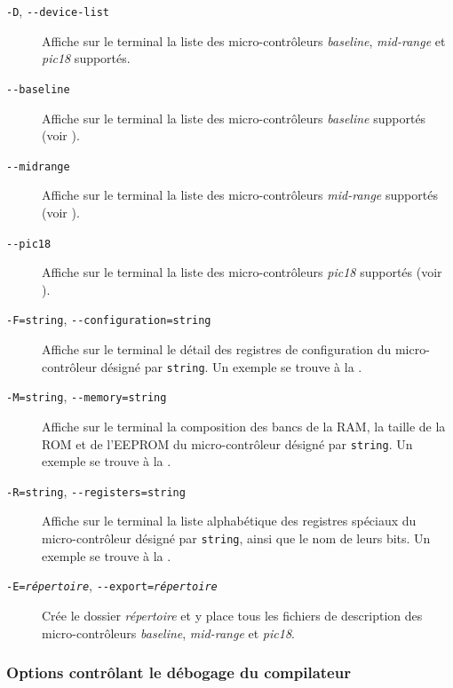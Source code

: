 \begin{description}


  \item[\texttt{-D}, \texttt{-{-}device-list}] Affiche sur le terminal la liste des micro-contrôleurs \emph{baseline}, \emph{mid-range} et \emph{pic18} supportés.

  \item[\texttt{-{-}baseline}] Affiche sur le terminal la liste des micro-contrôleurs \emph{baseline} supportés (voir ).

  \item[\texttt{-{-}midrange}] Affiche sur le terminal la liste des micro-contrôleurs \emph{mid-range} supportés (voir ).

  \item[\texttt{-{-}pic18}] Affiche sur le terminal la liste des micro-contrôleurs \emph{pic18} supportés (voir ).

  \item[\texttt{-F=string}, \texttt{-{-}configuration=string}] Affiche sur le terminal le détail des registres de configuration du micro-contrôleur désigné par \texttt{string}. Un exemple se trouve à la .

  \item[\texttt{-M=string}, \texttt{-{-}memory=string}] Affiche sur le terminal la composition des bancs de la RAM, la taille de la ROM et de l’EEPROM du micro-contrôleur désigné par \texttt{string}. Un exemple se trouve à la .

  \item[\texttt{-R=string}, \texttt{-{-}registers=string}] Affiche sur le terminal la liste alphabétique des registres spéciaux du micro-contrôleur désigné par \texttt{string}, ainsi que le nom de leurs bits. Un exemple se trouve à la .

  \item[\texttt{-E=\emph{répertoire}}, \texttt{-{-}export=\emph{répertoire}}] Crée le dossier \emph{répertoire} et y place tous les fichiers de description des micro-contrôleurs \emph{baseline}, \emph{mid-range} et \emph{pic18}.

\end{description}



\subsubsection{Options contrôlant le débogage du compilateur}

